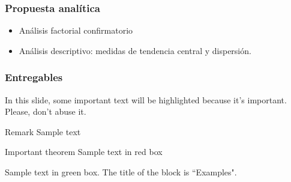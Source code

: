 \documentclass{beamer}
\begin{document}
\begin{frame}
\frametitle{Propuesta analítica}

\begin{itemize}
\item Análisis factorial confirmatorio	
\item Análisis descriptivo: medidas de tendencia central y dispersión. 
\end{itemize}	

\begin{frame}
\frametitle{Entregables}

In this slide, some important text will be
\alert{highlighted} because it's important.
Please, don't abuse it.

\begin{block}{Remark}
Sample text
\end{block}

\begin{alertblock}{Important theorem}
Sample text in red box
\end{alertblock}

\begin{examples}
Sample text in green box. The title of the block is ``Examples".
\end{examples}

\end{frame}



\end{frame}
\end{document}
